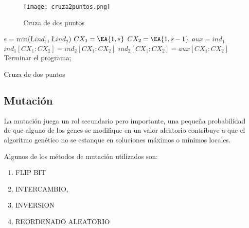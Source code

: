 \begin{figure}
  \centering
  \texttt{[image: cruza2puntos.png]}
  \caption{Cruza de dos puntos}\label{fig:cr2puntos}
\end{figure}


\begin{algorithm}[]
  \BlankLine
  s = min(\L{$ind_{1}$}, \L {$ind_{2}$})\;
  $CX_{1} = \EA{1, s}$\;
  $CX_{2} = \EA{1, s-1}$\;
  $aux = ind_{1}$\;
  $ind_{1}[CX_{1}:CX_{2}] = ind_{2}[CX_{1}:CX_{2}]$\;
  $ind_{2}[CX_{1}:CX_{2}] = aux[CX_{1}:CX_{2}]$\;
  \;
  Terminar el programa;
  \caption{Cruza de dos puntos}\label{algo:cr2puntos}
\end{algorithm}

\subsection{Mutación}
%
La mutación juega un rol secundario pero importante, una pequeña probabilidad
de que alguno de los genes se modifique en un valor aleatorio contribuye a que
el algoritmo genético no se estanque en soluciones máximos o mínimos locales.

Algunos de los métodos de mutación utilizados son:

\begin{enumerate}
  \item FLIP BIT
  \item INTERCAMBIO,
  \item INVERSION
  \item REORDENADO ALEATORIO
\end{enumerate}



